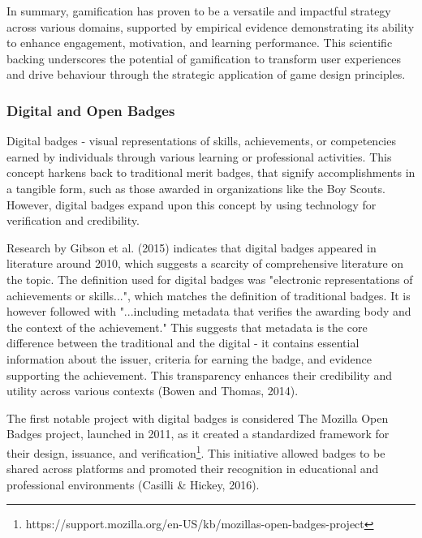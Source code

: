 In summary, gamification has proven to be a versatile and impactful strategy across various domains, supported by empirical evidence demonstrating its ability to enhance engagement, motivation, and learning performance. 
This scientific backing underscores the potential of gamification to transform user experiences and drive behaviour through the strategic application of game design principles.\\
%
\subsubsection{Digital and Open Badges}

Digital badges - visual representations of skills, achievements, or competencies earned by individuals through various learning or professional activities. 
This concept harkens back to traditional merit badges, that signify accomplishments in a tangible form, such as those awarded in organizations like the Boy Scouts. 
However, digital badges expand upon this concept by using technology for verification and credibility.

Research by Gibson et al. (2015)\cite{GibsonBadges} indicates that digital badges appeared in literature around 2010, which suggests a scarcity of comprehensive literature on the topic. 
The definition used for digital badges was "electronic representations of achievements or skills...", which matches the definition of traditional badges. 
It is however followed with "...including metadata that verifies the awarding body and the context of the achievement." 
This suggests that metadata is the core difference between the traditional and the digital - it contains essential information about the issuer, criteria for earning the badge, and evidence supporting the achievement. 
This transparency enhances their credibility and utility across various contexts (Bowen and Thomas, 2014)\cite{Bowen02012014}.

The first notable project with digital badges is considered The Mozilla Open Badges project, launched in 2011, as it created a standardized framework for their design, issuance, and verification\footnote{https://support.mozilla.org/en-US/kb/mozillas-open-badges-project}. 
This initiative allowed badges to be shared across platforms and promoted their recognition in educational and professional environments (Casilli \& Hickey, 2016)\cite{credentialsBadges}.

